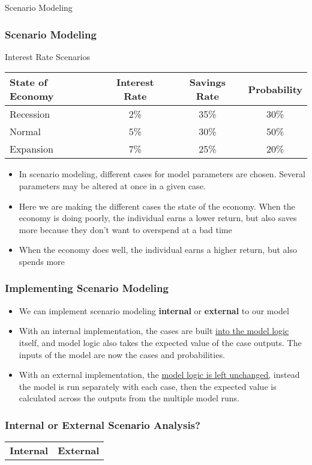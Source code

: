 \documentclass[handout, 11pt]{beamer}
\begin{document}
\begin{section}{Scenario Modeling}
\begin{frame}
\frametitle{Scenario Modeling}
\small
\begin{block}{Interest Rate Scenarios}
\begin{center}
\begin{tabular}{l|ccc}
State of Economy & Interest Rate & Savings Rate & Probability\\

\midrule
Recession & 2\% & 35\% & 30\%\\
Normal & 5\% & 30\% & 50\%\\
Expansion & 7\% & 25\% & 20\%\\

\end{tabular}
\end{center}
\end{block}
\begin{itemize}
\item In scenario modeling, different cases for model parameters are chosen. Several parameters may be altered at once in a given case.
\item Here we are making the different cases the state of the economy. When the economy is doing poorly, the individual earns a lower return, but also saves more because they don't want to overspend at a bad time
\item When the economy does well, the individual earns a higher return, but also spends more
\end{itemize}
\end{frame}
\begin{frame}
\frametitle{Implementing Scenario Modeling}
\begin{itemize}
\item We can implement scenario modeling
\textbf{internal}
or
\textbf{external}
to our model
\vfill
\item With an internal implementation, the cases are built
\underline{into the model logic}
itself, and model logic also takes the expected value of the case outputs. The inputs of the model
are now the cases and probabilities.
\vfill
\item With an external implementation, the
\underline{model logic is left unchanged,}
instead the model is run separately with each case, then the expected value is calculated across the outputs from the multiple model runs.
\end{itemize}
\end{frame}
\begin{frame}
\frametitle{Internal or External Scenario Analysis?}
\begin{center}
\begin{tabular}{L{5cm}|R{5cm}}
\textbf{Internal} & \textbf{External}\\


\end{tabular}
\end{center}
\end{frame}
\end{section}
\end{document}

